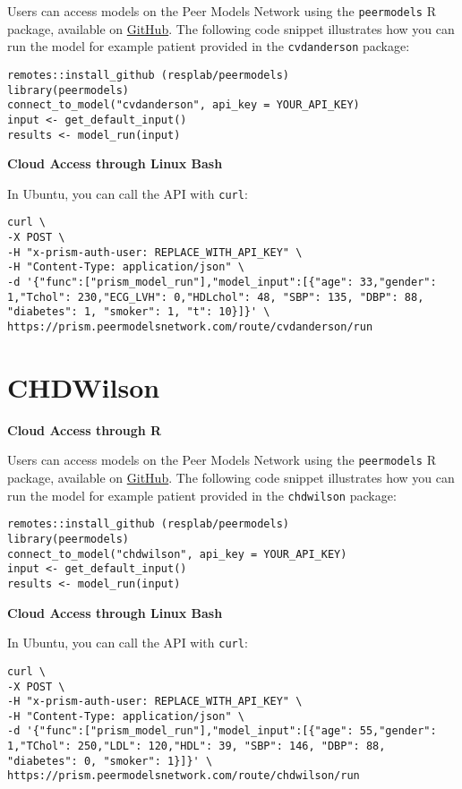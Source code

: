 \documentclass[
]{book}
\begin{document}
Users can access models on the Peer Models Network using the \texttt{peermodels} R package, available on \href{https://github.com/resplab/peermodels}{GitHub}. The following code snippet illustrates how you can run the model for example patient provided in the \texttt{cvdanderson} package:

\begin{verbatim}
remotes::install_github (resplab/peermodels)
library(peermodels)
connect_to_model("cvdanderson", api_key = YOUR_API_KEY)
input <- get_default_input()
results <- model_run(input)
\end{verbatim}

\textbf{Cloud Access through Linux Bash}

In Ubuntu, you can call the API with \texttt{curl}:

\begin{verbatim}
curl \
-X POST \
-H "x-prism-auth-user: REPLACE_WITH_API_KEY" \
-H "Content-Type: application/json" \
-d '{"func":["prism_model_run"],"model_input":[{"age": 33,"gender": 1,"Tchol": 230,"ECG_LVH": 0,"HDLchol": 48, "SBP": 135, "DBP": 88, "diabetes": 1, "smoker": 1, "t": 10}]}' \
https://prism.peermodelsnetwork.com/route/cvdanderson/run
\end{verbatim}

\hypertarget{chdwilson}{%
\section{CHDWilson}\label{chdwilson}}

\textbf{Cloud Access through R}

Users can access models on the Peer Models Network using the \texttt{peermodels} R package, available on \href{https://github.com/resplab/peermodels}{GitHub}. The following code snippet illustrates how you can run the model for example patient provided in the \texttt{chdwilson} package:

\begin{verbatim}
remotes::install_github (resplab/peermodels)
library(peermodels)
connect_to_model("chdwilson", api_key = YOUR_API_KEY)
input <- get_default_input()
results <- model_run(input)
\end{verbatim}

\textbf{Cloud Access through Linux Bash}

In Ubuntu, you can call the API with \texttt{curl}:

\begin{verbatim}
curl \
-X POST \
-H "x-prism-auth-user: REPLACE_WITH_API_KEY" \
-H "Content-Type: application/json" \
-d '{"func":["prism_model_run"],"model_input":[{"age": 55,"gender": 1,"TChol": 250,"LDL": 120,"HDL": 39, "SBP": 146, "DBP": 88, "diabetes": 0, "smoker": 1}]}' \
https://prism.peermodelsnetwork.com/route/chdwilson/run
\end{verbatim}
\end{document}
